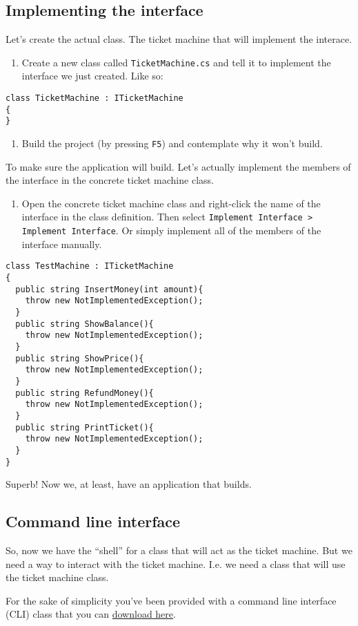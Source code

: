 \documentclass{article}
\newcounter{stepcounter}
\newenvironment{steps}{ 
  \begin{enumerate}[label=\color{red}Step \theenumi)]
    \setcounter{enumi}{\value{stepcounter}}
}{
  \setcounter{stepcounter}{\value{enumi}}
  \end{enumerate}
}
\begin{document}
\subsection{Implementing the interface}
Let’s create the actual class. The ticket machine that will implement the interace.
\begin{steps}
\item Create a new class called \texttt{TicketMachine.cs} and tell it to implement the interface we just created. Like so:
\end{steps}
\begin{lstlisting}
class TicketMachine : ITicketMachine
{
}
\end{lstlisting}
\begin{steps}
\item Build the project (by pressing \texttt{F5}) and contemplate why it won't build.
\end{steps}
To make sure the application will build. Let's actually implement the members of the interface in the concrete ticket machine class.
\begin{steps}
\item Open the concrete ticket machine class and right-click the name of the interface in the class definition. Then select \texttt{Implement Interface > Implement Interface}. Or simply implement all of the members of the interface manually.
\end{steps}
\begin{lstlisting}
class TestMachine : ITicketMachine
{
  public string InsertMoney(int amount){
    throw new NotImplementedException();
  }
  public string ShowBalance(){
    throw new NotImplementedException();
  }
  public string ShowPrice(){
    throw new NotImplementedException();
  }
  public string RefundMoney(){
    throw new NotImplementedException();
  }
  public string PrintTicket(){
    throw new NotImplementedException();
  }
}
\end{lstlisting}
Superb! Now we, at least, have an application that builds.


\subsection{Command line interface}
So, now we have the ``shell'' for a class that will act as the ticket machine. But we need a way to interact with the ticket machine. I.e. we need a class that will use the ticket machine class.

For the sake of simplicity you've been provided with a command line interface (CLI) class that you can \href{https://raw.githubusercontent.com/chrokh/software-engineering-labs/master/b1-oop/code/TicketMachine/TicketMachine/TicketMachineInteractor.cs}{download here}.
\end{document}
